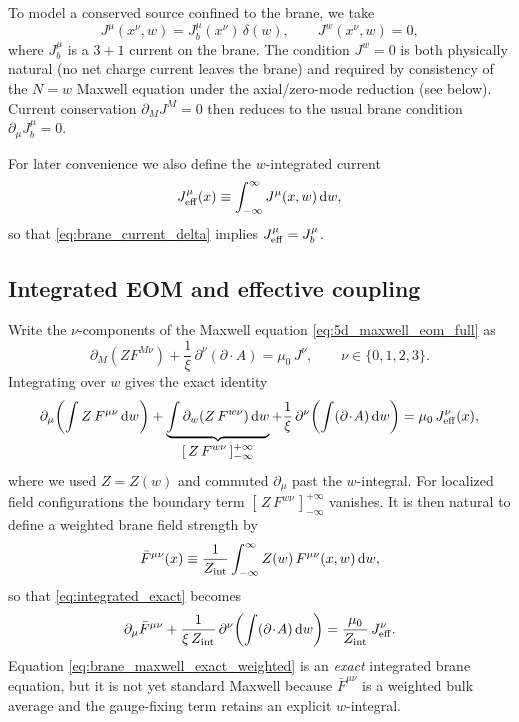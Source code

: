 \documentclass[11pt]{article}
\newcommand{\dd}{\mathrm d}
\newcommand{\A}{A}
\newcommand{\F}{F}
\newcommand{\J}{J}
\newcommand{\Z}{Z}
\newcommand{\Zint}{Z_{\rm int}} %
\newcommand{\muo}{\mu_0}
\newcommand{\xigf}{\xi}
\begin{document}
To model a conserved source confined to the brane, we take
\begin{equation}
  \J^\mu(x^\nu,w) = \J_b^\mu(x^\nu)\,\delta(w),
  \qquad
  \J^w(x^\nu,w)=0,
  \label{eq:brane_current_delta}
\end{equation}
where \(\J_b^\mu\) is a \(3+1\) current on the brane. The condition \(\J^w=0\) is
both physically natural (no net charge current leaves the brane) and required by
consistency of the \(N=w\) Maxwell equation under the axial/zero-mode reduction
(see below). Current conservation \(\partial_M\J^M=0\) then reduces to the usual
brane condition \(\partial_\mu \J_b^\mu=0\).

For later convenience we also define the \(w\)-integrated current
\begin{equation}
  \J_{\rm eff}^\mu(x) \equiv \int_{-\infty}^{\infty}\J^\mu(x,w)\,\dd w,
\end{equation}
so that \cref{eq:brane_current_delta} implies \(\J_{\rm eff}^\mu=\J_b^\mu\).

\subsection{Integrated EOM and effective coupling}
\label{sec:mu_eff}

Write the \(\nu\)-components of the Maxwell equation \cref{eq:5d_maxwell_eom_full}
as
\begin{equation}
  \partial_M\!\left(\Z \F^{M\nu}\right)
  + \frac{1}{\xigf}\,\partial^\nu(\partial\!\cdot\!\A)
  = \muo\,\J^\nu,
  \qquad \nu\in\{0,1,2,3\}.
  \label{eq:eom_nu}
\end{equation}
Integrating over \(w\) gives the exact identity
\begin{equation}
  \partial_\mu \!\left(\int \Z\,\F^{\mu\nu}\,\dd w\right)
  + \underbrace{\int \partial_w\!\left(\Z\,\F^{w\nu}\right)\dd w}_{\displaystyle [\,\Z\,\F^{w\nu}\,]_{-\infty}^{+\infty}}
  + \frac{1}{\xigf}\,\partial^\nu\!\left(\int (\partial\!\cdot\!\A)\,\dd w\right)
  = \muo\,\J_{\rm eff}^\nu(x),
  \label{eq:integrated_exact}
\end{equation}
where we used \(\Z=\Z(w)\) and commuted \(\partial_\mu\) past the \(w\)-integral.
For localized field configurations the boundary term
\([\,\Z\,\F^{w\nu}\,]_{-\infty}^{+\infty}\) vanishes. It is then natural to define
a weighted brane field strength by
\begin{equation}
  \bar{\F}^{\mu\nu}(x) \equiv \frac{1}{\Zint}\int_{-\infty}^{\infty}\Z(w)\,\F^{\mu\nu}(x,w)\,\dd w,
  \label{eq:Fbar_def}
\end{equation}
so that \cref{eq:integrated_exact} becomes
\begin{equation}
  \partial_\mu \bar{\F}^{\mu\nu}
  + \frac{1}{\xigf\,\Zint}\,\partial^\nu\!\left(\int (\partial\!\cdot\!\A)\,\dd w\right)
  = \frac{\muo}{\Zint}\,\J_{\rm eff}^\nu.
  \label{eq:brane_maxwell_exact_weighted}
\end{equation}
Equation \cref{eq:brane_maxwell_exact_weighted} is an \emph{exact} integrated
brane equation, but it is not yet standard Maxwell because \(\bar{\F}^{\mu\nu}\)
is a weighted bulk average and the gauge-fixing term retains an explicit
\(w\)-integral.
\end{document}

